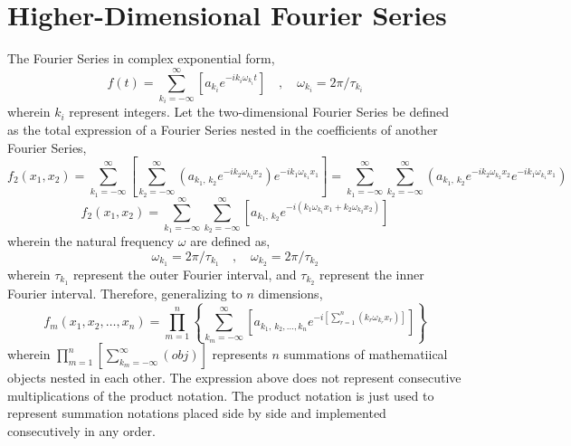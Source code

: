\section{Higher-Dimensional Fourier Series}
\begin{comment}
\end{comment}
The Fourier Series in complex exponential form,
$$f(t) = \sum^{\infty}_{k_i = -\infty}\left[a_{k_i}e^{-ik_i\omega_{k_i}t}\right]\quad,\quad \omega_{k_i} = 2\pi/\tau_{k_i}$$
wherein $k_i$ represent integers. Let the two-dimensional Fourier Series be defined as the total expression of a Fourier Series nested in the coefficients of another Fourier Series,
$$f_2(x_1,x_2) = \sum^{\infty}_{k_1 = -\infty}\left[\sum^{\infty}_{k_2 = -\infty}\left(a_{k_1,\,k_2}e^{-ik_2\omega_{k_2}x_2}\right)e^{-ik_1\omega_{k_1}x_1}\right] = \sum^{\infty}_{k_1 = -\infty}\sum^{\infty}_{k_2 = -\infty}\left(a_{k_1,\,k_2}e^{-ik_2\omega_{k_2}x_2}e^{-ik_1\omega_{k_1}x_1}\right)$$
$$f_2(x_1,x_2) = \sum^{\infty}_{k_1 = -\infty}\sum^{\infty}_{k_2 = -\infty}\left[a_{k_1,\,k_2}e^{-i(k_1\omega_{k_1}x_1+k_2\omega_{k_2}x_2)}\right]$$
wherein the natural frequency $\omega$ are defined as,
$$\omega_{k_1} = 2\pi/\tau_{k_1} \quad,\quad \omega_{k_2} = 2\pi/\tau_{k_2}$$
wherein $\tau_{k_1}$ represent the outer Fourier interval, and $\tau_{k_2}$ represent the inner Fourier interval. Therefore, generalizing to $n$ dimensions,
$$f_m(x_1,x_2,\dots,x_n) = \prod^{n}_{m=1}\left\{\sum^{\infty}_{k_m = -\infty}\left[a_{k_1,\,k_2,\dots,k_n}e^{-i\left[\sum^{n}_{r=1}\left(k_r\omega_{k_r}x_r\right)\right]}\right]\right\}$$
wherein $\displaystyle{\prod^{n}_{m=1}\left[\sum^{\infty}_{k_m = -\infty}(obj)\right]}$ represents $n$ summations of mathematiical objects nested in each other. The expression above does not represent consecutive multiplications of the product notation. The product notation is just used to represent summation notations placed side by side and implemented consecutively in any order. 
